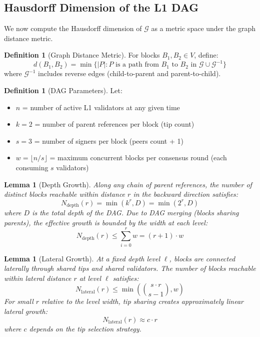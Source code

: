 \documentclass{article}
\newtheorem{lemma}[theorem]{Lemma}
\theoremstyle{definition}
\newtheorem{definition}[theorem]{Definition}
\theoremstyle{remark}
\theoremstyle{plain}
\begin{document}
\subsection{Hausdorff Dimension of the L1 DAG}

We now compute the Hausdorff dimension of $\mathcal{G}$ as a metric space under the graph distance metric.

\begin{definition}[Graph Distance Metric]
For blocks $B_1, B_2 \in V$, define:
\[
d(B_1, B_2) = \min\{|P| : P \text{ is a path from } B_1 \text{ to } B_2 \text{ in } \mathcal{G} \cup \mathcal{G}^{-1}\}
\]
where $\mathcal{G}^{-1}$ includes reverse edges (child-to-parent and parent-to-child).
\end{definition}

\begin{definition}[DAG Parameters]
Let:
\begin{itemize}
    \item $n$ = number of active L1 validators at any given time
    \item $k = 2$ = number of parent references per block (tip count)
    \item $s = 3$ = number of signers per block (peers count + 1)
    \item $w = \lfloor n/s \rfloor$ = maximum concurrent blocks per consensus round (each consuming $s$ validators)
\end{itemize}
\end{definition}

\begin{lemma}[Depth Growth]
Along any chain of parent references, the number of distinct blocks reachable within distance $r$ in the backward direction satisfies:
\[
N_{\mathrm{depth}}(r) = \min\left(k^r, D\right) = \min\left(2^r, D\right)
\]
where $D$ is the total depth of the DAG. Due to DAG merging (blocks sharing parents), the effective growth is bounded by the width at each level:
\[
N_{\mathrm{depth}}(r) \leq \sum_{i=0}^{r} w = (r+1) \cdot w
\]
\end{lemma}

\begin{lemma}[Lateral Growth]
At a fixed depth level $\ell$, blocks are connected laterally through shared tips and shared validators. The number of blocks reachable within lateral distance $r$ at level $\ell$ satisfies:
\[
N_{\mathrm{lateral}}(r) \leq \min\left(\binom{s \cdot r}{s-1}, w\right)
\]
For small $r$ relative to the level width, tip sharing creates approximately linear lateral growth:
\[
N_{\mathrm{lateral}}(r) \approx c \cdot r
\]
where $c$ depends on the tip selection strategy.
\end{lemma}
\end{document}
